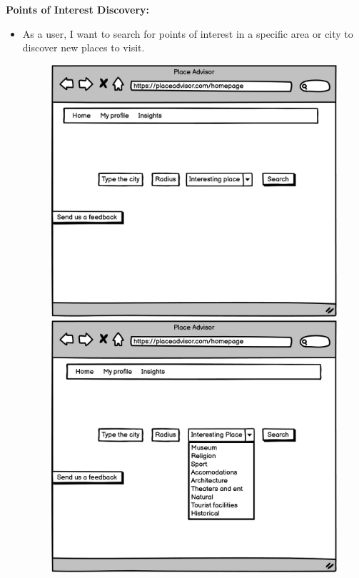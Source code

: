 \documentclass[../main.tex]{subfiles}
\begin{document}
\pagebreak
\textbf{Points of Interest Discovery:}
\begin{itemize}
  \item As a user, I want to search for points of interest in a specific area or city to discover new places to visit.
  \begin{figure}[h]
\begin{multicols}{2}
    \includegraphics[width=\linewidth]{figures/mockup/US4.png}\par 
    \includegraphics[width=\linewidth]{figures/mockup/US5.png}\par 
    \end{multicols}
\end{figure}
  

\end{itemize}
\end{document}
